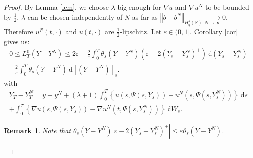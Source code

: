 \documentclass[12pt]{article}
\newtheorem{rem}{Remark}
\newcommand{\norme}[1]{\left\Vert #1\right\Vert}
\newcommand{\R}{\mathbb{R}}
\newcommand{\di}{\mathrm{d}}
\begin{document}
\begin{proof}
    By Lemma \ref{lem}, we choose $\lambda$ big enough for $\nabla u$ and $\nabla u^N$ to be bounded by $\frac{1}{2}$. $\lambda$ can be chosen independently of $N$ as far as $\norme{b - b^N}_{H_q^s(\R)} \underset{N\rightarrow\infty}{\longrightarrow} 0$. Therefore $u^N(t,\cdot)$ and $u(t,\cdot)$ are $\frac{1}{2}$-lipschitz. 
    Let $\varepsilon\in(0,1]$. Corollary \ref{cor} gives us:    
    \begin{multline*}
    0\leq L^0_T(Y-Y^N) \leq 2\varepsilon - \frac{2}{\varepsilon}\int_0^T \theta_s(Y-Y^N) \left(\varepsilon - 2{(Y_s-Y_s^N)^+}\right)\ \di (Y_s-Y_s^N)\\
    +\frac{2}{\varepsilon}\int_0^T \theta_s(Y-Y^N) \ \di[(Y-Y^N)]_s.
    \end{multline*}    
    with
    \begin{multline*}    
    Y_T-Y_T^N = y-y^N + (\lambda + 1 )\int_0^T\left\{u\left(s,\Psi\left(s,Y_s\right)\right)-u^N\left(s,\Psi\left(s,Y_s^N\right)\right)\right\}\ \di s\\ + \int_0^T\left\{\nabla u\left(s,\Psi\left(s,Y_s\right)\right)-\nabla u^N\left(t,\Psi\left(s,Y_s^N\right)\right)\right\}\ \di W_s.
    \end{multline*}    
    \begin{rem}
        Note that $\theta_s(Y-Y^N) \left|\varepsilon - 2{(Y_s-Y_s^N)^+}\right|\leq \varepsilon\theta_s(Y-Y^N)$.
    \end{rem}


\end{proof}
\end{document}
